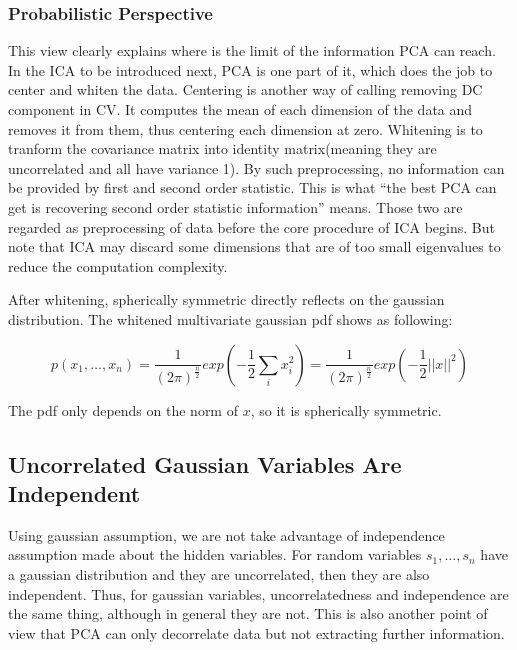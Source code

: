 \documentclass[a4paper]{book}
\begin{document}
      \subsubsection{Probabilistic Perspective}
      This view clearly explains where is the limit of the information
      PCA can reach. In the ICA to be introduced next, PCA is one part
      of it, which does the job to center and whiten the data. Centering
      is another way of calling removing DC component in CV. It computes
      the mean of each dimension of the data and removes it from them,
      thus centering each dimension at zero. Whitening is to tranform
      the covariance matrix into identity matrix(meaning they are
      uncorrelated and all have variance 1). By such preprocessing, no
      information can be provided by first and second order statistic.
      This is what ``the best PCA can get is recovering second order
      statistic information'' means.  Those two are regarded as
      preprocessing of data before the core procedure of ICA begins. But
      note that ICA may discard some dimensions that are of too small
      eigenvalues to reduce the computation complexity.

      After whitening, spherically symmetric directly reflects on the
      gaussian distribution. The whitened multivariate gaussian pdf
      shows as following:

      \begin{displaymath}
        p(x_{1}, \ldots, x_{n}) =
        \frac{1}{(2\pi)^{\frac{n}{2}}}exp(-\frac{1}{2}\sum\limits^{}_{i}x_{i}^{2})
        = \frac{1}{(2\pi)^{\frac{n}{2}}}exp(-\frac{1}{2}||x||^{2})
      \end{displaymath}

      The pdf only depends on the norm of $x$, so it is spherically
      symmetric.

      \subsection{Uncorrelated Gaussian Variables Are Independent} Using
      gaussian assumption, we are not take advantage of independence
      assumption made about the hidden variables\cite{Hyvrinen09}. For
      random variables $s_{1}, \ldots, s_{n}$ have a gaussian
      distribution and they are uncorrelated, then they are also
      independent. Thus, for gaussian variables, uncorrelatedness and
      independence are the same thing, although in general they are not.
      This is also another point of view that PCA can only decorrelate
      data but not extracting further information.
\end{document}
